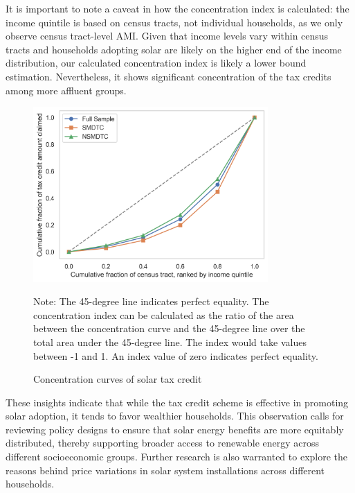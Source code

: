 \documentclass[11pt,twoside,letterpaper]{article}
\begin{document}
It is important to note a caveat in how the concentration index is calculated: the income quintile is based on census tracts, not individual households, as we only observe census tract-level AMI. Given that income levels vary within census tracts and households adopting solar are likely on the higher end of the income distribution, our calculated concentration index is likely a lower bound estimation. Nevertheless, it shows significant concentration of the tax credits among more affluent groups. 


\begin{figure}[!ht]
    \centering
\includegraphics[width=0.8\textwidth]{figures/credit_claim_amount_distribution_by_income.png}
    \caption{Concentration curves of solar tax credit}
    \label{fig:credit_claim_distribution}
    \begin{flushleft}
        \footnotesize Note: The 45-degree line indicates perfect equality. The concentration index can be calculated as the ratio of the area between the concentration curve and the 45-degree line over the total area under the 45-degree line. The index would take values between -1 and 1. An index value of zero indicates perfect equality. 
    \end{flushleft}
\end{figure}


These insights indicate that while the tax credit scheme is effective in promoting solar adoption, it tends to favor wealthier households. This observation calls for reviewing policy designs to ensure that solar energy benefits are more equitably distributed, thereby supporting broader access to renewable energy across different socioeconomic groups. Further research is also warranted to explore the reasons behind price variations in solar system installations across different households.
\end{document}
